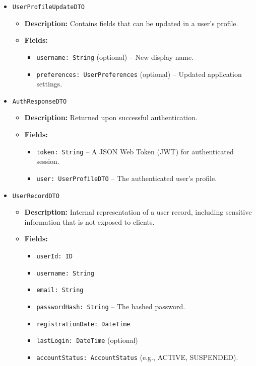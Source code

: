 \begin{itemize}
    \item \texttt{UserProfileUpdateDTO}
    \begin{itemize}
        \item \textbf{Description:} Contains fields that can be updated in a user's profile.
        \item \textbf{Fields:}
        \begin{itemize}
            \item \texttt{username: String} (optional) – New display name.
            \item \texttt{preferences: UserPreferences} (optional) – Updated application settings.
        \end{itemize}
    \end{itemize}

    \item \texttt{AuthResponseDTO}
    \begin{itemize}
        \item \textbf{Description:} Returned upon successful authentication.
        \item \textbf{Fields:}
        \begin{itemize}
            \item \texttt{token: String} – A JSON Web Token (JWT) for authenticated session.
            \item \texttt{user: UserProfileDTO} – The authenticated user's profile.
        \end{itemize}
    \end{itemize}

    \item \texttt{UserRecordDTO}
    \begin{itemize}
        \item \textbf{Description:} Internal representation of a user record, including sensitive information that is not exposed to clients.
        \item \textbf{Fields:}
        \begin{itemize}
            \item \texttt{userId: ID}
            \item \texttt{username: String}
            \item \texttt{email: String}
            \item \texttt{passwordHash: String} – The hashed password.
            \item \texttt{registrationDate: DateTime}
            \item \texttt{lastLogin: DateTime} (optional)
            \item \texttt{accountStatus: AccountStatus} (e.g., ACTIVE, SUSPENDED).
        \end{itemize}
    \end{itemize}


\end{itemize}
